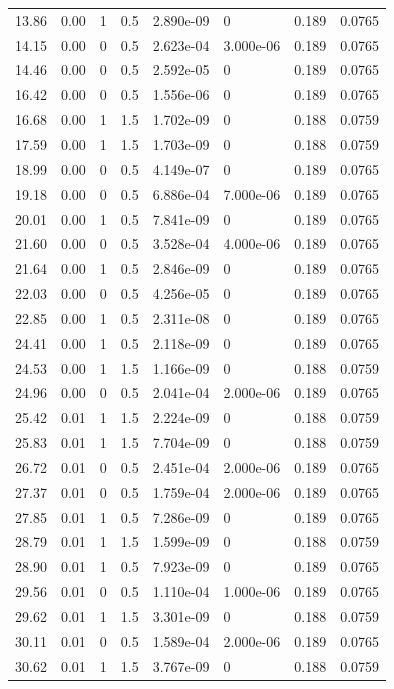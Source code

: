 \documentclass[preview]{standalone}
\begin{document}
{{\begin{tabular}{L{1.2cm}C{1.2cm} C{0.3cm}C{0.5cm} C{1.4cm}C{1.4cm} C{1.4cm}C{1.4cm}}
  13.86  &  0.00  & 1     & 0.5 &  2.890e-09  & 0  & 0.189 &  0.0765   \\ 
  14.15  &  0.00  & 0     & 0.5 &  2.623e-04  & 3.000e-06  & 0.189 &  0.0765   \\ 
  14.46  &  0.00  & 0     & 0.5 &  2.592e-05  & 0  & 0.189 &  0.0765   \\ 
  16.42  &  0.00  & 0     & 0.5 &  1.556e-06  & 0  & 0.189 &  0.0765   \\ 
  16.68  &  0.00  & 1     & 1.5 &  1.702e-09  & 0  & 0.188 &  0.0759   \\ 
  17.59  &  0.00  & 1     & 1.5 &  1.703e-09  & 0  & 0.188 &  0.0759   \\ 
  18.99  &  0.00  & 0     & 0.5 &  4.149e-07  & 0  & 0.189 &  0.0765   \\ 
  19.18  &  0.00  & 0     & 0.5 &  6.886e-04  & 7.000e-06  & 0.189 &  0.0765   \\ 
  20.01  &  0.00  & 1     & 0.5 &  7.841e-09  & 0  & 0.189 &  0.0765   \\ 
  21.60  &  0.00  & 0     & 0.5 &  3.528e-04  & 4.000e-06  & 0.189 &  0.0765   \\ 
  21.64  &  0.00  & 1     & 0.5 &  2.846e-09  & 0  & 0.189 &  0.0765   \\ 
  22.03  &  0.00  & 0     & 0.5 &  4.256e-05  & 0  & 0.189 &  0.0765   \\ 
  22.85  &  0.00  & 1     & 0.5 &  2.311e-08  & 0  & 0.189 &  0.0765   \\ 
  24.41  &  0.00  & 1     & 0.5 &  2.118e-09  & 0  & 0.189 &  0.0765   \\ 
  24.53  &  0.00  & 1     & 1.5 &  1.166e-09  & 0  & 0.188 &  0.0759   \\ 
  24.96  &  0.00  & 0     & 0.5 &  2.041e-04  & 2.000e-06  & 0.189 &  0.0765   \\ 
  25.42  &  0.01  & 1     & 1.5 &  2.224e-09  & 0  & 0.188 &  0.0759   \\ 
  25.83  &  0.01  & 1     & 1.5 &  7.704e-09  & 0  & 0.188 &  0.0759   \\ 
  26.72  &  0.01  & 0     & 0.5 &  2.451e-04  & 2.000e-06  & 0.189 &  0.0765   \\ 
  27.37  &  0.01  & 0     & 0.5 &  1.759e-04  & 2.000e-06  & 0.189 &  0.0765   \\ 
  27.85  &  0.01  & 1     & 0.5 &  7.286e-09  & 0  & 0.189 &  0.0765   \\ 
  28.79  &  0.01  & 1     & 1.5 &  1.599e-09  & 0  & 0.188 &  0.0759   \\ 
  28.90  &  0.01  & 1     & 0.5 &  7.923e-09  & 0  & 0.189 &  0.0765   \\ 
  29.56  &  0.01  & 0     & 0.5 &  1.110e-04  & 1.000e-06  & 0.189 &  0.0765   \\ 
  29.62  &  0.01  & 1     & 1.5 &  3.301e-09  & 0  & 0.188 &  0.0759   \\ 
  30.11  &  0.01  & 0     & 0.5 &  1.589e-04  & 2.000e-06  & 0.189 &  0.0765   \\ 
  30.62  &  0.01  & 1     & 1.5 &  3.767e-09  & 0  & 0.188 &  0.0759   \\ 
\hline 
\end{tabular} 

}}
\end{document}

